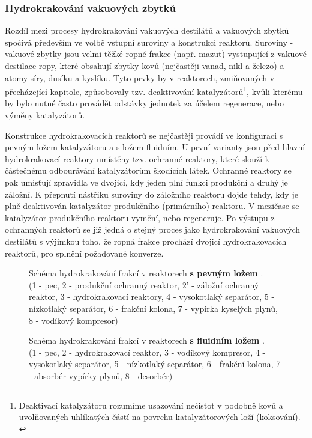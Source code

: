 \subsubsection{Hydrokrakování vakuových zbytků}

Rozdíl mezi procesy hydrokrakování vakuových destilátů a vakuových zbytků spočívá především ve volbě vstupní suroviny a konstrukci reaktorů. Suroviny - vakuové zbytky jsou velmi těžké ropné frakce (např. mazut) vystupující z vakuové destilace ropy, které obsahují zbytky kovů (nejčastěji vanad, nikl a železo) a atomy síry, dusíku a kyslíku. Tyto prvky by v reaktorech, zmiňovaných v přecházející kapitole, způsobovaly tzv. deaktivování katalyzátorů\footnote{Deaktivací katalyzátoru rozumíme usazování nečistot v podobně kovů a uvolňovaných uhlíkatých částí na povrchu katalyzátorových loží (koksování). \cite{Blazek2006}}, kvůli kterému by bylo nutné často provádět odstávky jednotek za účelem regenerace, nebo výměny katalyzátorů. \cite{Blazek2006,Prajapati2021}

Konstrukce hydrokrakovacích reaktorů se nejčastěji provádí ve konfiguraci s pevným ložem katalyzátoru a s ložem fluidním. U první varianty jsou před hlavní hydrokrakovací reaktory umístěny tzv. ochranné reaktory, které slouží k částečnému odbourávání katalyzátorům škodících látek. Ochranné reaktory se pak umisťují zpravidla ve dvojici, kdy jeden plní funkci produkční a druhý je záložní. K přepnutí nástřiku suroviny do záložního reaktoru dojde tehdy, kdy je plně deaktivován katalyzátor produkčního (primárního) reaktoru. V mezičase se katalyzátor produkčního reaktoru vymění, nebo regeneruje. Po výstupu z ochranných reaktorů se již jedná o stejný proces jako hydrokrakování vakuových destilátů s výjimkou toho, že ropná frakce prochází dvojicí hydrokrakovacích reaktorů, pro splnění požadované konverze. \cite{Blazek2006}
\begin{figure}[h]
    \centering
    
    \caption[Schéma hydrokrakování frakcí v reaktorech s pevným ložem]{Schéma hydrokrakování frakcí v reaktorech \textbf{s pevným ložem} \cite{Blazek2006}.\\(1 - pec, 2 - produkční ochranný reaktor, 2' - záložní ochranný reaktor, 3 - hydrokrakovací reaktory, 4 - vysokotlaký separátor, 5 - nízkotlaký separátor, 6 - frakční kolona, 7 - vypírka kyselých plynů, 8 - vodíkový kompresor)} \label{fig:hydrokrak_Pschema}
\end{figure}
\begin{figure}[ht]
    \centering
    
    \caption[Schéma hydrokrakování frakcí v reaktorech s fluidním ložem]{Schéma hydrokrakování frakcí v reaktorech \textbf{s fluidním ložem} \cite{Blazek2006}.\\(1 - pec, 2 - hydrokrakovací reaktor, 3 - vodíkový kompresor, 4 - vysokotlaký separátor, 5 - nízkotlaký separátor, 6 - frakční kolona, 7 - absorbér vypírky plynů, 8 - desorbér) } \label{fig:hydrokrak_Vschema}
\end{figure}

